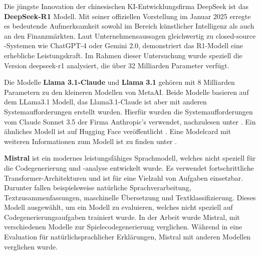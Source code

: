 Die jüngste Innovation der chinesischen KI-Entwicklungsfirma DeepSeek ist das \textbf{DeepSeek-R1} Modell. Mit seiner offiziellen Vorstellung im Januar 2025 erregte es bedeutende Aufmerksamkeit sowohl im Bereich künstlicher Intelligenz als auch an den Finanzmärkten. Laut Unternehmensaussagen gleichwertig zu closed-source -Systemen wie ChatGPT-4 oder Gemini 2.0, demonstriert das R1-Modell eine erhebliche Leistungskraft. Im Rahmen dieser Untersuchung wurde speziell die Version deepseek-r1 analysiert, die über 32 Milliarden Parameter verfügt.\vspace{0.2cm}

Die Modelle \textbf{Llama 3.1-Claude} und \textbf{Llama 3.1} gehören mit 8 Milliarden Parametern zu den kleineren Modellen von MetaAI. Beide Modelle basieren auf dem LLama3.1 Modell, das Llama3.1-Claude ist aber mit anderen Systemaufforderungen erstellt wurden. Hierfür wurden die Systemaufforderungen vom Claude Sonnet 3.5 der Firma Anthropic’s verwendet, nachzulesen unter \cite{ollama_page_llama31_claude}. Ein ähnliches Modell ist auf Hugging Face veröffentlicht \cite{huggingface_page_llama31_claude}. Eine Modelcard mit weiteren Informationen zum Modell ist zu finden unter \cite{meta-llama-no-date}.\vspace{0.2cm}

\textbf{Mistral} ist ein modernes leistungsfähiges Sprachmodell, welches nicht speziell für die Codegenerierung und -analyse entwickelt wurde. Es verwendet fortschrittliche Transformer-Architekturen und ist für eine Vielzahl von Aufgaben einsetzbar. Darunter fallen beispielsweise natürliche Sprachverarbeitung, Textzusammenfassungen, maschinelle Übersetzung und Textklassifizierung. Dieses Modell ausgewählt, um ein Modell zu evaluieren, welches nicht speziell auf Codegenerierungsaufgaben trainiert wurde. In der Arbeit \cite{eberhardinger-2024} wurde Mistral, mit verschiedenen Modelle zur Spielecodegenerierung verglichen. Während in \cite{quan-2024} eine Evaluation für natürlichsprachlicher Erklärungen, Mistral mit anderen Modellen verglichen wurde.\vspace{0.2cm}


